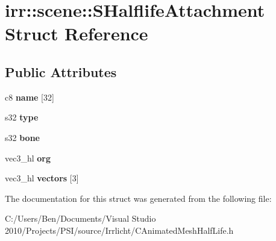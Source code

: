 \hypertarget{structirr_1_1scene_1_1_s_halflife_attachment}{\section{irr\-:\-:scene\-:\-:S\-Halflife\-Attachment Struct Reference}
\label{structirr_1_1scene_1_1_s_halflife_attachment}
}
\subsection*{Public Attributes}
\begin{DoxyCompactItemize}
\item 
\hypertarget{structirr_1_1scene_1_1_s_halflife_attachment_a09d754057ac939be1e403c99f5a73852}{c8 {\bfseries name} \mbox{[}32\mbox{]}}\label{structirr_1_1scene_1_1_s_halflife_attachment_a09d754057ac939be1e403c99f5a73852}

\item 
\hypertarget{structirr_1_1scene_1_1_s_halflife_attachment_ad489311fa02b8f5464f2f8f8bae5bd79}{s32 {\bfseries type}}\label{structirr_1_1scene_1_1_s_halflife_attachment_ad489311fa02b8f5464f2f8f8bae5bd79}

\item 
\hypertarget{structirr_1_1scene_1_1_s_halflife_attachment_a40c022be1d5cb5de90984421ffaefdf0}{s32 {\bfseries bone}}\label{structirr_1_1scene_1_1_s_halflife_attachment_a40c022be1d5cb5de90984421ffaefdf0}

\item 
\hypertarget{structirr_1_1scene_1_1_s_halflife_attachment_aaf876a8579063b94032115d2150a8576}{vec3\-\_\-hl {\bfseries org}}\label{structirr_1_1scene_1_1_s_halflife_attachment_aaf876a8579063b94032115d2150a8576}

\item 
\hypertarget{structirr_1_1scene_1_1_s_halflife_attachment_a57d0e90d2b8ad11858a7b0a52720cedc}{vec3\-\_\-hl {\bfseries vectors} \mbox{[}3\mbox{]}}\label{structirr_1_1scene_1_1_s_halflife_attachment_a57d0e90d2b8ad11858a7b0a52720cedc}

\end{DoxyCompactItemize}


The documentation for this struct was generated from the following file\-:\begin{DoxyCompactItemize}
\item 
C\-:/\-Users/\-Ben/\-Documents/\-Visual Studio 2010/\-Projects/\-P\-S\-I/source/\-Irrlicht/C\-Animated\-Mesh\-Half\-Life.\-h\end{DoxyCompactItemize}
